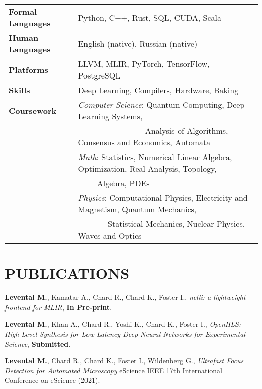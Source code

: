\documentclass[11pt,letterpaper,roman,colorlinks,linkcolor=blue]{moderncv}
\newcommand*{\modern}{\fontfamily{qhv}\selectfont}
\newcommand{\mystyle}[1]{\textcolor{mygrey}{\modern #1}}
\newcommand{\mysectionstyle}[1]{\large\mystyle{#1}}
\begin{document}
\begin{tabular}{ @{} >{\bfseries}l @{\hspace{6ex}} l }
Formal Languages  & Python, C++, Rust, SQL, CUDA, Scala \\
Human Languages  & English (native), Russian (native) \\
Platforms  & LLVM, MLIR, PyTorch, TensorFlow, PostgreSQL \\
Skills     & Deep Learning, Compilers, Hardware, Baking \\
Coursework & \textit{Computer Science}: Quantum Computing, Deep Learning Systems, \\
	   & $\qquad$ $\qquad$ $\qquad$ $\quad$ Analysis of Algorithms, Consensus and Economics, Automata \\
           & \textit{Math}: Statistics, Numerical Linear Algebra, Optimization, Real Analysis, Topology, \\
           & $\qquad$ \hspace{0.5ex} Algebra, PDEs  \\
           & \textit{Physics}: Computational Physics, Electricity and Magnetism, Quantum Mechanics, \\ 
           & $\qquad$ $\quad$ \hspace{0.00ex} Statistical Mechanics, Nuclear Physics, Waves and Optics
\end{tabular}


\section{\mysectionstyle{PUBLICATIONS}}

\begin{hangingpar}
\textbf{Levental M.}, Kamatar A., Chard R., Chard K., Foster I.,
\textit{nelli: a lightweight frontend for MLIR}, 
\textbf{In Pre-print}.
\end{hangingpar}

\begin{hangingpar}
\textbf{Levental M.}, Khan A., Chard R., Yoshi K., Chard K., Foster I.,
\textit{OpenHLS: High-Level Synthesis for Low-Latency Deep Neural Networks for Experimental Science},
\textbf{Submitted}.
\end{hangingpar}

\begin{hangingpar}
\textbf{Levental M.}, Chard R., Chard K., Foster I., Wildenberg G.,
\textit{Ultrafast Focus Detection for Automated Microscopy} 
eScience IEEE 17th International Conference on eScience (2021).
\end{hangingpar}
\end{document}
